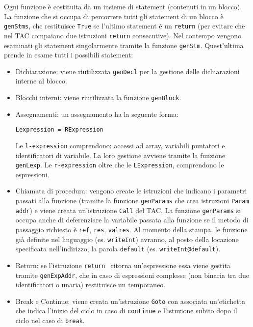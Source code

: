
Ogni funzione è costituita da un insieme di statement (contenuti in un blocco). La funzione che si occupa di percorrere tutti gli statement di un blocco è {\tt genStms}, che restituisce {\tt True} se l'ultimo statement è un {\tt return} (per evitare che nel TAC compaiano due istruzioni {\tt return} consecutive). Nel contempo vengono esaminati gli statement singolarmente tramite la funzione {\tt genStm}.
Quest'ultima prende in esame tutti i possibili statement:
\begin{itemize}
    \item Dichiarazione: viene riutilizzata {\tt genDecl} per la gestione delle dichiarazioni interne al blocco.
    \item Blocchi interni: viene riutilizzata la funzione {\tt genBlock}.
    \item Assegnamenti: un assegnamento ha la seguente forma:
    \begin{center}
        {\tt Lexpression = RExpression}
    \end{center}
    Le {\tt l-expression} comprendono: accessi ad array, variabili puntatori e identificatori di variabile. La loro gestione avviene tramite la funzione {\tt genLexp}. Le {\tt r-expression} oltre che le {\tt LExpression}, comprendono le espressioni.
    \item Chiamata di procedura: vengono create le istruzioni che indicano i parametri passati alla funzione (tramite la funzione {\tt genParams} che crea istruzioni {\tt Param addr}) e viene creata un'istruzione {\tt Call} del TAC. La funzione {\tt genParams} si occupa anche di deferenziare la variabile passata alla funzione se il metodo di passaggio richiesto è {\tt ref}, {\tt res}, {\tt valres}. Al momento della stampa, le funzione già definite nel linguaggio (es. {\tt writeInt}) avranno, al posto della locazione specificata nell'indirizzo, la parola {\tt default} (es. {\tt writeInt@default}).
    \item Return: se l'istruzione {\tt return } ritorna un'espressione essa viene gestita tramite {\tt genExpAddr}, che in caso di espressioni complesse (non binaria tra due identificatori o unaria) restituisce un temporaneo.
    \item Break e Continue: viene creata un'istruzione {\tt Goto} con associata un'etichetta che indica l'inizio del ciclo in caso di {\tt continue} e l'istuzione subito dopo il ciclo nel caso di {\tt break}.
    

\end{itemize}
